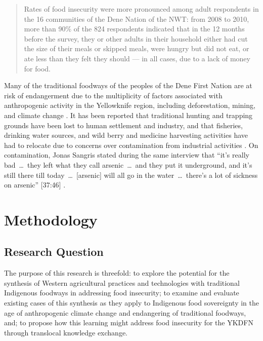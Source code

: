 \documentclass{report}
\begin{document}
\begin{quote}
  Rates of food insecurity were more pronounced among adult respondents in the 16 communities of the Dene Nation of the NWT: from 2008 to 2010, more than 90\% of the 824 respondents indicated that in the 12 months before the survey, they or other adults in their household either had cut the size of their meals or skipped meals, were hungry but did not eat, or ate less than they felt they should — in all cases, due to a lack of money for food. \parencite[42]{aboriginalfoodsecurity}
\end{quote} %

\hspace{24pt} Many of the traditional foodways of the peoples of the Dene First Nation are at risk of endangerment due to the multiplicity of factors associated with anthropogenic activity in the Yellowknife region, including deforestation, mining, and climate change \parencite{denefoodwaysontologies}.
It has been reported that traditional hunting and trapping grounds have been lost to human settlement and industry, and that fisheries, drinking water sources, and wild berry and medicine harvesting activities have had to relocate due to concerns over contamination from industrial activities \parencite{riskperceptions}.
On contamination, Jonas Sangris stated during the same interview that ``it's really bad~\ldots~they left what they call arsenic~\ldots~and they put it underground, and it's still there till today~\ldots~[arsenic] will all go in the water~\ldots~there's a lot of sickness on arsenic'' [37:46] \parencite{jonassangris}.

\section{Methodology}

\subsection{Research Question}

\hspace{24pt} The purpose of this research is threefold:
to explore the potential for the synthesis of Western agricultural practices and technologies with traditional Indigenous foodways in addressing food insecurity;
to examine and evaluate existing cases of this synthesis as they apply to Indigenous food sovereignty in the age of anthropogenic climate change and endangering of traditional foodways, and;
to propose how this learning might address food insecurity for the YKDFN through translocal knowledge exchange.
\end{document}
